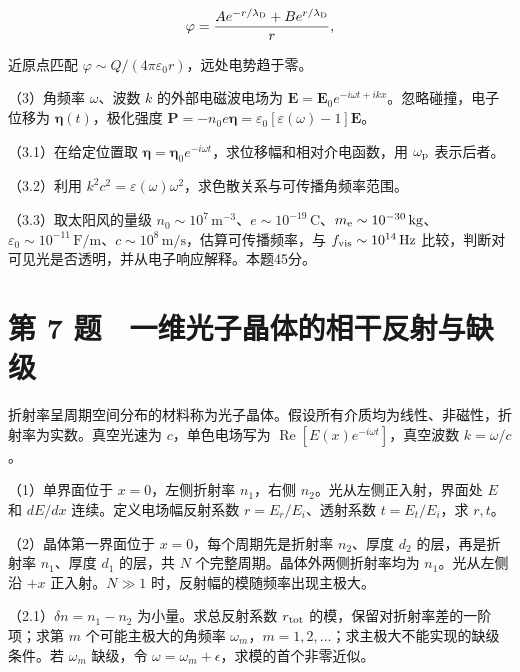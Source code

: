 \documentclass[12pt,a4paper,fontset=fandol]{ctexart}
\begin{document}
\[
\varphi=\frac{Ae^{-r/\lambda_{\rm D}}+Be^{r/\lambda_{\rm D}}}{r},
\]

近原点匹配 \(\varphi\sim Q/(4\pi\varepsilon_0r)\)，远处电势趋于零。

（3）角频率 \(\omega\)、波数 \(k\) 的外部电磁波电场为
\(\boldsymbol E=\boldsymbol E_0e^{-i\omega t+ikx}\)。忽略碰撞，电子位移为
\(\boldsymbol\eta(t)\)，极化强度
\(\boldsymbol P=-n_0e\boldsymbol\eta=\varepsilon_0[\varepsilon(\omega)-1]\boldsymbol E\)。

（3.1）在给定位置取
\(\boldsymbol\eta=\boldsymbol\eta_0e^{-i\omega t}\)，求位移幅和相对介电函数，用
\(\omega_{\rm p}\) 表示后者。

（3.2）利用
\(k^2c^2=\varepsilon(\omega)\omega^2\)，求色散关系与可传播角频率范围。

（3.3）取太阳风的量级
\(n_0\sim10^7\,\mathrm{m^{-3}}\)、\(e\sim10^{-19}\,\mathrm C\)、\(m_{\rm e}\sim10^{-30}\,\mathrm{kg}\)、\(\varepsilon_0\sim10^{-11}\,\mathrm{F/m}\)、\(c\sim10^8\,\mathrm{m/s}\)，估算可传播频率，与
\(f_{\rm vis}\sim10^{14}\,\mathrm{Hz}\)
比较，判断对可见光是否透明，并从电子响应解释。本题45分。

\bigskip

\section{第 7
题　一维光子晶体的相干反射与缺级}\label{ux7b2c-7-ux9898-ux4e00ux7ef4ux5149ux5b50ux6676ux4f53ux7684ux76f8ux5e72ux53cdux5c04ux4e0eux7f3aux7ea7}

折射率呈周期空间分布的材料称为光子晶体。假设所有介质均为线性、非磁性，折射率为实数。真空光速为
\(c\)，单色电场写为 \(\operatorname{Re}[E(x)e^{-i\omega t}]\)，真空波数
\(k=\omega/c\)。

（1）单界面位于 \(x=0\)，左侧折射率 \(n_1\)，右侧
\(n_2\)。光从左侧正入射，界面处 \(E\) 和 \(dE/dx\)
连续。定义电场幅反射系数 \(r=E_r/E_i\)、透射系数 \(t=E_t/E_i\)，求
\(r,t\)。

（2）晶体第一界面位于 \(x=0\)，每个周期先是折射率 \(n_2\)、厚度 \(d_2\)
的层，再是折射率 \(n_1\)、厚度 \(d_1\) 的层，共 \(N\)
个完整周期。晶体外两侧折射率均为 \(n_1\)。光从左侧沿 \(+x\)
正入射。\(N\gg1\) 时，反射幅的模随频率出现主极大。

（2.1）\(\delta n=n_1-n_2\) 为小量。求总反射系数 \(r_{\rm tot}\)
的模，保留对折射率差的一阶项；求第 \(m\) 个可能主极大的角频率
\(\omega_m\)，\(m=1,2,\ldots\)；求主极大不能实现的缺级条件。若
\(\omega_m\) 缺级，令 \(\omega=\omega_m+\epsilon\)，求模的首个非零近似。
\end{document}
